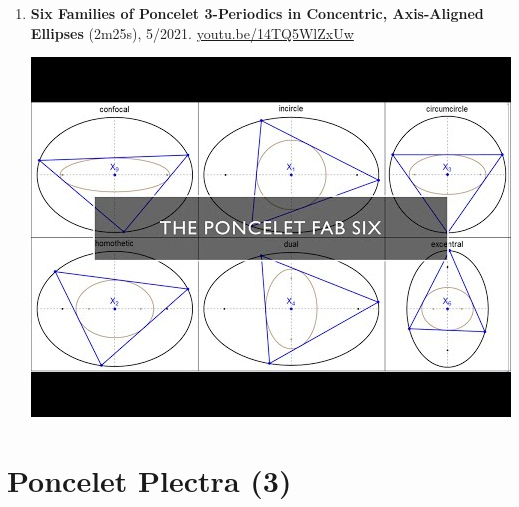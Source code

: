 \documentclass[12pt]{article}
\begin{document}
\begin{enumerate}[resume]
% 
\item \textbf{Six Families of Poncelet 3-Periodics in Concentric, Axis-Aligned Ellipses} (2m25s), 5/2021. \href{https://youtu.be/14TQ5WlZxUw}{\url{youtu.be/14TQ5WlZxUw}}
\begin{center}\includegraphics[width=.5\textwidth]{pics/14TQ5WlZxUw.jpg}\end{center}
% 
\end{enumerate}

\section{Poncelet Plectra (3)}
\end{document}

